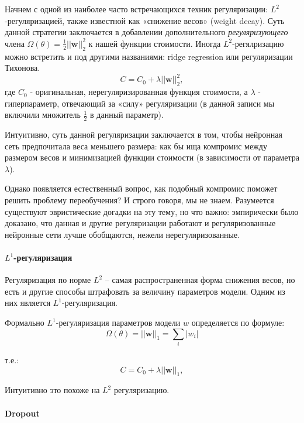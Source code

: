 Начнем с одной из наиболее часто встречающихся техник регуляризации: 
$L^2$-регуляризацией, также известной как «снижение весов» (weight decay). 
Суть данной стратегии заключается в добавлении дополнительного \textit{регуляризующего} 
члена $\Omega(\theta) = \frac{1}{2} || \bm{w} ||^2_2$ к нашей функции стоимости. 
Иногда $L^2$-регялризацию можно встретить и под другими названиями: ridge regression или 
регуляризации Тихонова.
\begin{equation*}
    C = C_0 + \lambda || \bm{w} ||^2_2,
\end{equation*}
где $C_0$ - оригинальная, нерегуляризированная функция стоимости, 
а $\lambda$ - гиперпараметр, отвечающий за «силу» регуляризации (в данной записи 
мы включили множитель $\frac{1}{2}$ в данный параметр). 

Интуитивно, суть данной регуляризации заключается в том, чтобы нейронная сеть 
предпочитала веса меньшего размера: как бы ища компромис между размером весов и 
минимизацией функции стоимости (в зависимости от параметра $\lambda$).

Однако появляется естественный вопрос, как подобный компромис поможет решить 
проблему переобучения? И строго говоря, мы не знаем. Разумеется существуют 
эвристические догадки на эту тему, но что важно: эмпирически 
было доказано, что данная и другие регуляризации работают и регуляризованные 
нейронные сети лучше обобщаются, нежели нерегуляризованные.

\paragraph{$L^1$-регуляризация}

Регуляризация по норме $L^2$ – самая распространенная форма снижения весов, но есть
и другие способы штрафовать за величину параметров модели. Одним из них является 
$L^1$-регуляризация.

Формально $L^1$-регуляризация параметров модели $w$ определяется по формуле:
\begin{equation*}
    \Omega(\theta) = ||\bm{w}||_1 = \sum_i |w_i|
\end{equation*}

т.е.:
\begin{equation*}
    C = C_0 + \lambda || \bm{w} ||_1,
\end{equation*}

Интуитивно это похоже на $L^2$ регуляризацию.

\paragraph{Dropout}

